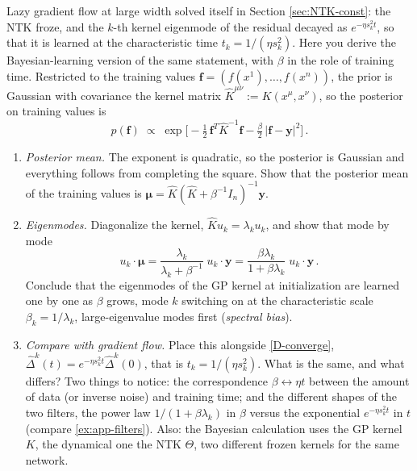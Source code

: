 \documentclass[11pt]{article}
\begin{document}
\begin{exercise}
\label{ex:kernel-ridge}
\important
Lazy gradient flow at large width solved itself in Section \ref{sec:NTK-const}: the NTK froze, and the $k$-th kernel eigenmode of the residual decayed as $e^{-\eta s_k^2t}$, so that it is learned at the characteristic time $t_k = 1/(\eta s_k^2)$. Here you derive the Bayesian-learning version of the same statement, with $\beta$ in the role of training time. Restricted to the training values $\mathbf f = (f(x^1),\ldots,f(x^n))$, the prior is Gaussian with covariance the kernel matrix $\hat K^{\mu\nu} := K(x^\mu,x^\nu)$, so the posterior on training values is
%
\begin{equation}
    p(\mathbf f)\;\propto\;\exp\Big[-\tfrac{1}{2}\,\mathbf f^T\hat K^{-1}\mathbf f - \tfrac{\beta}{2}\,|\mathbf f-\mathbf y|^2\Big]\,.
\end{equation}
\begin{enumerate}
    \item \emph{Posterior mean.} The exponent is quadratic, so the posterior is Gaussian and everything follows from completing the square. Show that the posterior mean of the training values is $\boldsymbol\mu = \hat K(\hat K+\beta^{-1}I_n)^{-1}\mathbf y$.
    \item \emph{Eigenmodes.} Diagonalize the kernel, $\hat Ku_k = \lambda_ku_k$, and show that mode by mode
    \begin{equation} \label{bayes-filter}
        u_k\cdot\boldsymbol\mu = \frac{\lambda_k}{\lambda_k+\beta^{-1}}\;u_k\cdot\mathbf y = \frac{\beta\lambda_k}{1+\beta\lambda_k}\;u_k\cdot\mathbf y\,.
    \end{equation}
    Conclude that the eigenmodes of the GP kernel at initialization are learned one by one as $\beta$ grows, mode $k$ switching on at the characteristic scale $\beta_k = 1/\lambda_k$, large-eigenvalue modes first (\emph{spectral bias}).
    \item \emph{Compare with gradient flow.} Place this alongside \eqref{D-converge}, $\hat\Delta^k(t) = e^{-\eta s_k^2t}\hat\Delta^k(0)$, that is $t_k = 1/(\eta s_k^2)$. What is the same, and what differs? Two things to notice: the correspondence $\beta\leftrightarrow\eta t$ between the amount of data (or inverse noise) and training time; and the different shapes of the two filters, the power law $1/(1+\beta\lambda_k)$ in $\beta$ versus the exponential $e^{-\eta s_k^2t}$ in $t$ (compare \cref{ex:app-filters}). Also: the Bayesian calculation uses the GP kernel $K$, the dynamical one the NTK $\Theta$, two different frozen kernels for the same network.

\end{enumerate}
\end{exercise}
\end{document}
